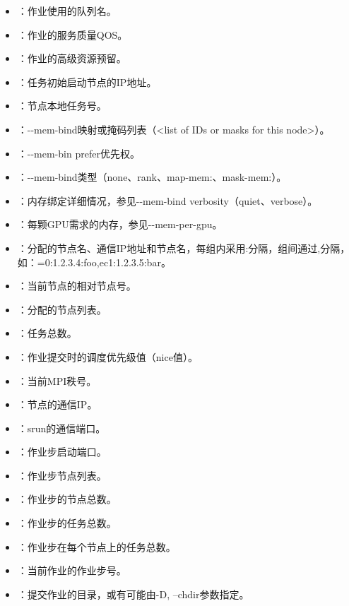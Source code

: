 \begin{itemize}
	\item {}：作业使用的队列名。
	\item {}：作业的服务质量QOS。
	\item {}：作业的高级资源预留。
	\item {}：任务初始启动节点的IP地址。
	\item {}：节点本地任务号。
	\item {}：-{}-mem-bind映射或掩码列表（<list of IDs or masks for this node>）。
	\item {}：-{}-mem-bin prefer优先权。
	\item {}：-{}-mem-bind类型（none、rank、map-mem:、mask-mem:）。
	\item {}：内存绑定详细情况，参见-{}-mem-bind verbosity（quiet、verbose）。
	\item {}：每颗GPU需求的内存，参见-{}-mem-per-gpu。
	\item {}：分配的节点名、通信IP地址和节点名，每组内采用:分隔，组间通过,分隔，如：=0:1.2.3.4:foo,ec1:1.2.3.5:bar。
	\item {}：当前节点的相对节点号。
	\item {}：分配的节点列表。
	\item {}：任务总数。
	\item {}：作业提交时的调度优先级值（nice值）。
	\item {}：当前MPI秩号。
	\item {}：节点的通信IP。
	\item {}：srun的通信端口。
	\item {}：作业步启动端口。
	\item {}：作业步节点列表。
	\item {}：作业步的节点总数。
	\item {}：作业步的任务总数。
	\item {}：作业步在每个节点上的任务总数。
	\item {}：当前作业的作业步号。
	\item {}：提交作业的目录，或有可能由-D, --chdir参数指定。

\end{itemize}
